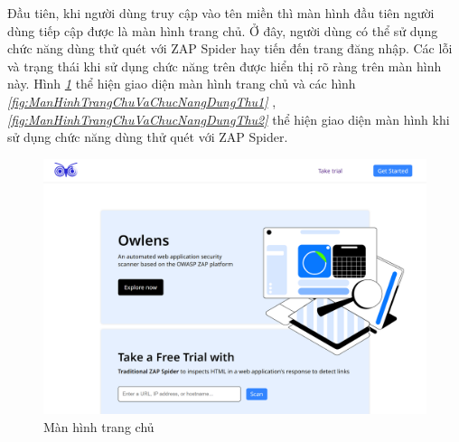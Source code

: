 \tab \tab Đầu tiên, khi người dùng truy cập vào tên miền thì màn hình đầu tiên người dùng tiếp cập được là màn hình trang chủ.
Ở đây, người dùng có thể sử dụng chức năng dùng thử quét với ZAP Spider hay tiến đến trang đăng nhập.
Các lỗi và trạng thái khi sử dụng chức năng trên được hiển thị rõ ràng trên màn hình này.
Hình \textit{\ref{fig:ManHinhTrangChu} } 
thể hiện giao diện màn hình trang chủ và các hình \textit{\ref{fig:ManHinhTrangChuVaChucNangDungThu1} }
, \textit{\ref{fig:ManHinhTrangChuVaChucNangDungThu2} } 
thể hiện giao diện màn hình khi sử dụng chức năng dùng thử quét với ZAP Spider.

\begin{figure}[H]
      \centering
      \includegraphics[width=\textwidth]{applied-thesis-chapters/chapter-6/Màn hình trang chủ.png}
      \caption{Màn hình trang chủ}
      \label{fig:ManHinhTrangChu}
\end{figure}

